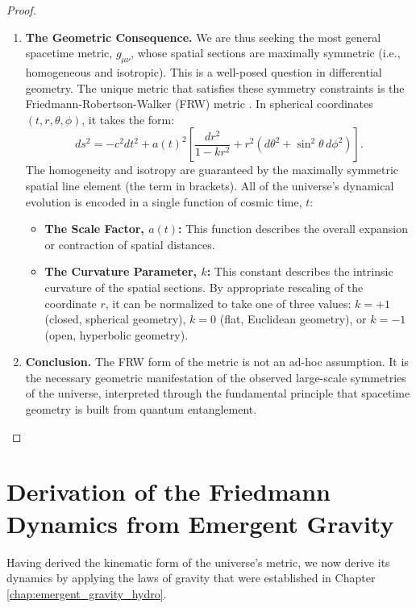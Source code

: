 \documentclass[11pt, letterpaper]{report}
\theoremstyle{plain} %
\theoremstyle{definition} %
\theoremstyle{remark} %
\begin{document}
\begin{proof}
\begin{enumerate}
    \item \textbf{The Geometric Consequence.} We are thus seeking the most general spacetime metric, $g_{\mu\nu}$, whose spatial sections are maximally symmetric (i.e., homogeneous and isotropic). This is a well-posed question in differential geometry. The unique metric that satisfies these symmetry constraints is the Friedmann-Robertson-Walker (FRW) metric \cite{Friedmann1922,Lemaitre1927,Robertson1935,Walker1937}. In spherical coordinates $(t, r, \theta, \phi)$, it takes the form:
    \begin{equation}
        ds^2 = -c^2 dt^2 + a(t)^2 \left[ \frac{dr^2}{1-kr^2} + r^2(d\theta^2 + \sin^2\theta \, d\phi^2) \right].
        \label{eq:frw_metric_app}
    \end{equation}
    The homogeneity and isotropy are guaranteed by the maximally symmetric spatial line element (the term in brackets). All of the universe's dynamical evolution is encoded in a single function of cosmic time, $t$:
    \begin{itemize}
        \item \textbf{The Scale Factor, $a(t)$:} This function describes the overall expansion or contraction of spatial distances.
        \item \textbf{The Curvature Parameter, $k$:} This constant describes the intrinsic curvature of the spatial sections. By appropriate rescaling of the coordinate $r$, it can be normalized to take one of three values: $k=+1$ (closed, spherical geometry), $k=0$ (flat, Euclidean geometry), or $k=-1$ (open, hyperbolic geometry).
    \end{itemize}

    \item \textbf{Conclusion.} The FRW form of the metric is not an ad-hoc assumption. It is the necessary geometric manifestation of the observed large-scale symmetries of the universe, interpreted through the fundamental principle that spacetime geometry is built from quantum entanglement.
\end{enumerate}
\end{proof}

\section{Derivation of the Friedmann Dynamics from Emergent Gravity}
\label{app:friedmann_eq_derivation}

Having derived the kinematic form of the universe's metric, we now derive its dynamics by applying the laws of gravity that were established in Chapter \ref{chap:emergent_gravity_hydro}.
\end{document}
